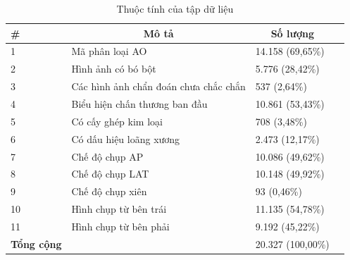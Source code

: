 \documentclass[../the.tex]{subfiles}
\begin{document}
\begin{table}[!ht]
	\centering
	\caption{Thuộc tính của tập dữ liệu}
	\begin{tabular}{|p{2cm}|p{4cm}|p{3.5cm}|p{2cm}|}
		\hline
		\multicolumn{1}{|l|}{
		\textbf{\#}} 
		& \multicolumn{1}{c|}{\textbf{Mô tả}} 
		& \multicolumn{1}{c|}{\textbf{Số lượng}} \\
		\hline
	
		 1
		& Mã phân loại AO 
		& 14.158 (69,65\%)\\
		\hline
		
		 2
		& Hình ảnh có bó bột 
		& 5.776 (28,42\%)\\
		\hline
		
		 3
		& Các hình ảnh chẩn đoán chưa chắc chắn 
		& 537 (2,64\%) \\
        \hline
        
		 4
		& Biểu hiện chấn thương ban đầu
		& 10.861 (53,43\%) \\
        \hline
        
		 5
		& Có cấy ghép kim loại
		& 708 (3,48\%) \\
        \hline
        
		 6
		& Có dấu hiệu loãng xương
		& 2.473 (12,17\%) \\
        \hline
        
		 7
		& Chế độ chụp AP
		& 10.086 (49,62\%) \\
        \hline
        
		 8
		& Chế độ chụp LAT
		& 10.148 (49,92\%) \\
        \hline
        
		 9
		& Chế độ chụp xiên
		& 93 (0,46\%) \\
        \hline
        
		 10
		& Hình chụp từ bên trái
		& 11.135 (54,78\%) \\
        \hline
        
		 11
		& Hình chụp từ bên phải
		& 9.192 (45,22\%) \\
        \hline
        
		 \textbf{Tổng cộng}
		& 
		& 20.327 (100,00\%) \\
		\hline
	\end{tabular}
	
	\label{tab:dataset}
\end{table}
\end{document}
